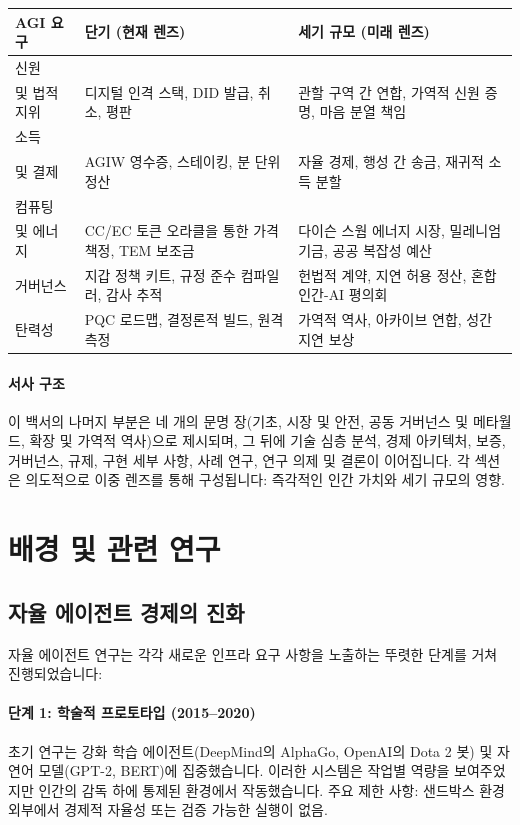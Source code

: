 \documentclass[11pt]{article}
\begin{document}
\begin{longtable}{@{}p{}p{}p{}@{}}
\toprule
\textbf{AGI 요구} & \textbf{단기 (현재 렌즈)} & \textbf{세기 규모 (미래 렌즈)} \\\midrule
신원 \\ 및 법적 지위 & 디지털 인격 스택, DID 발급, 취소, 평판 & 관할 구역 간 연합, 가역적 신원 증명, 마음 분열 책임 \\
소득 \\ 및 결제 & AGIW 영수증, 스테이킹, 분 단위 정산 & 자율 경제, 행성 간 송금, 재귀적 소득 분할 \\
컴퓨팅 \\ 및 에너지 & CC/EC 토큰 오라클을 통한 가격 책정, TEM 보조금 & 다이슨 스웜 에너지 시장, 밀레니엄 기금, 공공 복잡성 예산 \\
거버넌스 & 지갑 정책 키트, 규정 준수 컴파일러, 감사 추적 & 헌법적 계약, 지연 허용 정산, 혼합 인간-AI 평의회 \\
탄력성 & PQC 로드맵, 결정론적 빌드, 원격 측정 & 가역적 역사, 아카이브 연합, 성간 지연 보상 \\\bottomrule
\end{longtable}

\paragraph{서사 구조} 이 백서의 나머지 부분은 네 개의 문명 장(기초, 시장 및 안전, 공동 거버넌스 및 메타월드, 확장 및 가역적 역사)으로 제시되며, 그 뒤에 기술 심층 분석, 경제 아키텍처, 보증, 거버넌스, 규제, 구현 세부 사항, 사례 연구, 연구 의제 및 결론이 이어집니다. 각 섹션은 의도적으로 이중 렌즈를 통해 구성됩니다: 즉각적인 인간 가치와 세기 규모의 영향.

\section{배경 및 관련 연구}
\subsection{자율 에이전트 경제의 진화}
자율 에이전트 연구는 각각 새로운 인프라 요구 사항을 노출하는 뚜렷한 단계를 거쳐 진행되었습니다:

\paragraph{단계 1: 학술적 프로토타입 (2015--2020)} 초기 연구는 강화 학습 에이전트(DeepMind의 AlphaGo, OpenAI의 Dota 2 봇) 및 자연어 모델(GPT-2, BERT)에 집중했습니다. 이러한 시스템은 작업별 역량을 보여주었지만 인간의 감독 하에 통제된 환경에서 작동했습니다. 주요 제한 사항: 샌드박스 환경 외부에서 경제적 자율성 또는 검증 가능한 실행이 없음.
\end{document}
